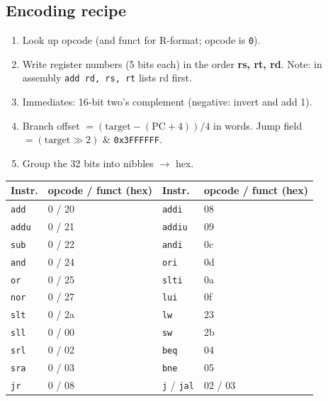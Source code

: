 \documentclass[11pt]{article}
\begin{document}
\subsection{Encoding recipe}
\begin{enumerate}[leftmargin=*]
  \item Look up opcode (and funct for R-format; opcode is \texttt{0}).
  \item Write register numbers (5 bits each) in the order \textbf{rs, rt,
  rd}. Note: in assembly \texttt{add rd, rs, rt} lists rd first.
  \item Immediates: 16-bit two's complement (negative: invert and add 1).
  \item Branch offset $= (\text{target} - (\text{PC}+4))/4$ in words.
  Jump field $= (\text{target} \gg 2)$ \& \texttt{0x3FFFFFF}.
  \item Group the 32 bits into nibbles $\to$ hex.
\end{enumerate}

\begin{center}
\small
\begin{tabular}{@{}llll@{}}
\toprule
Instr. & opcode / funct (hex) & Instr. & opcode / funct (hex) \\
\midrule
\texttt{add}  & 0 / 20 & \texttt{addi} & 08 \\
\texttt{addu} & 0 / 21 & \texttt{addiu}& 09 \\
\texttt{sub}  & 0 / 22 & \texttt{andi} & 0c \\
\texttt{and}  & 0 / 24 & \texttt{ori}  & 0d \\
\texttt{or}   & 0 / 25 & \texttt{slti} & 0a \\
\texttt{nor}  & 0 / 27 & \texttt{lui}  & 0f \\
\texttt{slt}  & 0 / 2a & \texttt{lw}   & 23 \\
\texttt{sll}  & 0 / 00 & \texttt{sw}   & 2b \\
\texttt{srl}  & 0 / 02 & \texttt{beq}  & 04 \\
\texttt{sra}  & 0 / 03 & \texttt{bne}  & 05 \\
\texttt{jr}   & 0 / 08 & \texttt{j} / \texttt{jal} & 02 / 03 \\
\bottomrule
\end{tabular}
\end{center}
\end{document}
